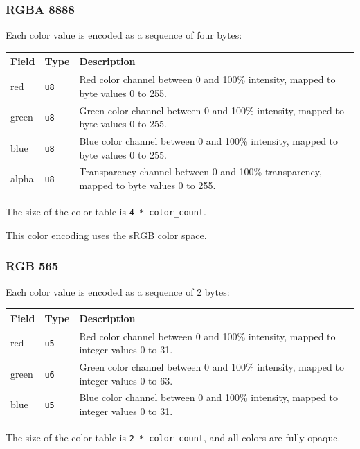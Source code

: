 \documentclass[]{article}
\begin{document}
\hypertarget{rgba-8888}{\subsubsection{RGBA 8888}\label{rgba-8888}}

Each color value is encoded as a sequence of four bytes:

\begin{longtable}[]{@{}p{0.5in}p{0.5in}p{5.0in}@{}}
\toprule
Field & Type & Description \\
\midrule
\endhead
red & \texttt{u8} & Red color channel between 0 and 100\% intensity, mapped to byte values 0 to 255. \\
green & \texttt{u8} & Green color channel between 0 and 100\% intensity, mapped to byte values 0 to 255. \\
blue & \texttt{u8} & Blue color channel between 0 and 100\% intensity, mapped to byte values 0 to 255. \\
alpha & \texttt{u8} & Transparency channel between 0 and 100\% transparency, mapped to byte values 0 to 255. \\
\bottomrule
\end{longtable}

The size of the color table is \texttt{4\ *\ color\_count}.

This color encoding uses the sRGB color space.

\hypertarget{rgb-565}{\subsubsection{RGB 565}\label{rgb-565}}

Each color value is encoded as a sequence of 2 bytes:

\begin{longtable}[]{@{}p{0.5in}p{0.5in}p{5.0in}@{}}
\toprule
Field & Type & Description \\
\midrule
\endhead
red & \texttt{u5} & Red color channel between 0 and 100\% intensity, mapped to integer values 0 to 31. \\
green & \texttt{u6} & Green color channel between 0 and 100\% intensity, mapped to integer values 0 to 63. \\
blue & \texttt{u5} & Blue color channel between 0 and 100\% intensity, mapped to integer values 0 to 31. \\
\bottomrule
\end{longtable}

The size of the color table is \texttt{2\ *\ color\_count}, and all
colors are fully opaque.
\end{document}
